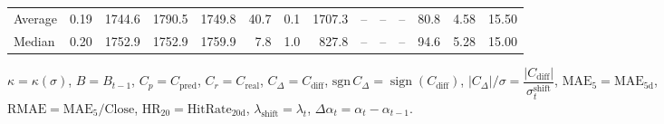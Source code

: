 \begin{threeparttable}
{\begin{tabular}{lrrrrrrrrrrrrr}
Average &     0.19 & 1744.6 & 1790.5 & 1749.8 &       40.7 &                      0.1 &              1707.3 &         -- &        -- &             -- &             80.8 &            4.58 &                  15.50 \\
 Median &     0.20 & 1752.9 & 1752.9 & 1759.9 &        7.8 &                      1.0 &               827.8 &         -- &        -- &             -- &             94.6 &            5.28 &                  15.00 \\
\bottomrule
\end{tabular}
}
\begin{tablenotes}\footnotesize
\item $\kappa=\kappa(\sigma)$, $B=B_{t-1}$, $C_p=C_{\text{pred}}$, $C_r=C_{\text{real}}$, $C_\Delta=C_{\text{diff}}$, $\mathrm{sgn}\,C_\Delta=\operatorname{sign}(C_{\text{diff}})$, $|C_\Delta|/\sigma=\dfrac{|C_{\text{diff}}|}{\sigma_t^{\text{shift}}}$, $\mathrm{MAE}_5=\mathrm{MAE}_{5\text{d}}$, $\mathrm{RMAE}= \mathrm{MAE}_5 / \text{Close}$, $\mathrm{HR}_{20}=\mathrm{HitRate}_{20\text{d}}$, 
$\lambda_{\text{shift}}=\lambda_t$, 
$\Delta\alpha_t=\alpha_t-\alpha_{t-1}$.
\end{tablenotes}
\end{threeparttable}
\endgroup
